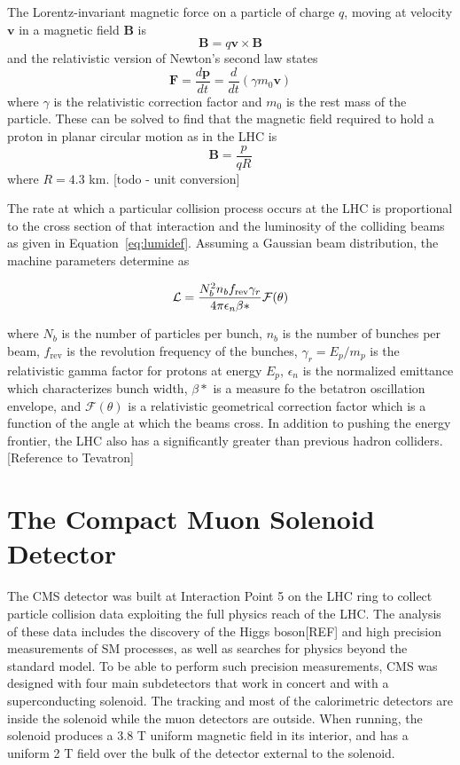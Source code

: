 The Lorentz-invariant magnetic force on a
  particle of charge $q$, moving at
  velocity $\mathbf{v}$ in a 
  magnetic field $\mathbf{B}$ is
\begin{equation}\label{eq:bforce}
 \mathbf{B}=q\mathbf{v}\times\mathbf{B}
\end{equation}
 and the relativistic version of Newton's second
 law states
\begin{equation}
 \mathbf{F} = \frac{d\mathbf{p}}{dt} =
  \frac{d}{dt}\left ( \gamma m_0 \mathbf{v}  \right )
\end{equation}
 where $\gamma$ is the relativistic correction
 factor and $m_0$ is the rest mass of the particle.
These can be solved to find that the magnetic field
 required to hold a proton in planar
 circular motion as in the LHC is
\begin{equation}
 \mathbf{B}=\frac{p}{qR}
\end{equation}
 where $R = 4.3$ km.
[todo - unit conversion]

The rate at which a particular collision 
 process occurs
 at the LHC is proportional to 
 the cross section of that interaction
 and the luminosity of the colliding beams
 as given in Equation~\ref{eq:lumidef}.
Assuming a Gaussian beam distribution,
 the machine parameters determine \lumi as

\begin{equation}\label{eq:lumi}
 \mathcal L=\frac{N_b^2 n_b f_{\mathrm{rev}} \gamma_r}{4\pi\epsilon_n \beta*}\mathcal{F}(\theta)
\end{equation}

 where $N_b$ is the number of particles per bunch,
 $n_b$ is the number of bunches per beam,
 $f_{\mathrm{rev}}$ is the revolution frequency of the bunches,
 $\gamma_r=E_p/m_p$ is the relativistic gamma factor
  for protons at energy $E_p$,
 $\epsilon_n$ is the normalized emittance which 
  characterizes bunch width,
 $\beta*$ is a measure fo the betatron oscillation envelope,
 and $\mathcal{F}(\theta)$ is a relativistic geometrical 
 correction factor which is a function of the
 angle at which the beams cross.
In addition to pushing the energy frontier,
 the LHC also has a significantly greater
 \lumi than previous hadron colliders. 
[Reference to Tevatron]
 
\section{The Compact Muon Solenoid Detector}

The CMS detector was built
 at Interaction Point 5 on the LHC ring
 to collect particle collision data  exploiting the full physics reach
 of the LHC.
The analysis of these data includes
 the discovery of the Higgs boson[REF]
 and high precision measurements of SM processes,
 as well as searches for physics beyond the standard model.
To be able to perform such precision measurements,
 CMS was designed with four main subdetectors 
 that work in concert and with a superconducting solenoid.
The tracking and most of the calorimetric
 detectors are inside the solenoid while
 the muon detectors are outside.
When running, the solenoid produces a 3.8 T 
 uniform magnetic field in its interior,
 and has a uniform 2 T field 
 over the bulk of the detector external to the solenoid.

